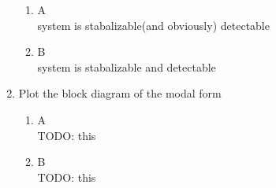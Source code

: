 \begin{enumerate}
\begin{enumerate}
    \item A\\
      system is stabalizable(and obviously) detectable
    \item B\\
      system is stabalizable and detectable
    \end{enumerate}
  \item Plot the block diagram of the modal form\\
    \begin{enumerate}
    \item A\\
      {\LARGE \color{red} TODO: this}
    \item B\\
      {\LARGE \color{red} TODO: this}
    \end{enumerate}
  \end{enumerate}